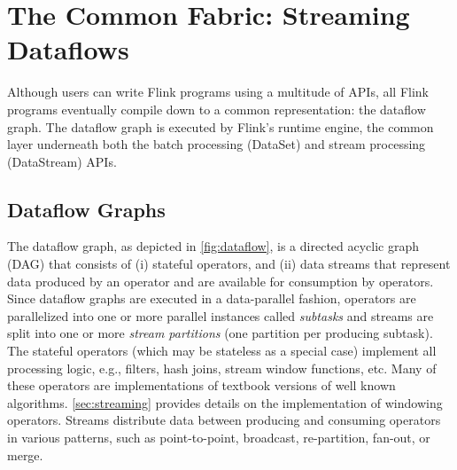 
\section{The Common Fabric: Streaming Dataflows}
\label{sec:execution}

Although users can write Flink programs using a multitude of APIs, all Flink programs eventually compile down to a common representation: the dataflow graph. The dataflow graph is executed by Flink's runtime engine, the common layer underneath both the batch processing (DataSet) and stream processing (DataStream) APIs.


\subsection{Dataflow Graphs}
The dataflow graph, as depicted in \autoref{fig:dataflow}, is a directed acyclic graph (DAG) that consists of (i) stateful operators, and (ii) data streams that represent data produced by an operator and are available for consumption by operators. Since dataflow graphs are executed in a data-parallel fashion, operators are parallelized into one or more parallel instances called \emph{subtasks} and streams are split into one or more \emph{stream partitions} (one partition per producing subtask). 
The stateful operators (which may be stateless as a special case) implement all processing logic, e.g., filters, hash joins, stream window functions, etc. Many of these operators are implementations of textbook versions of well known algorithms. \autoref{sec:streaming} provides details on the implementation of windowing operators. Streams distribute data between producing and consuming operators in various patterns, such as point-to-point, broadcast, re-partition, fan-out, or merge.







